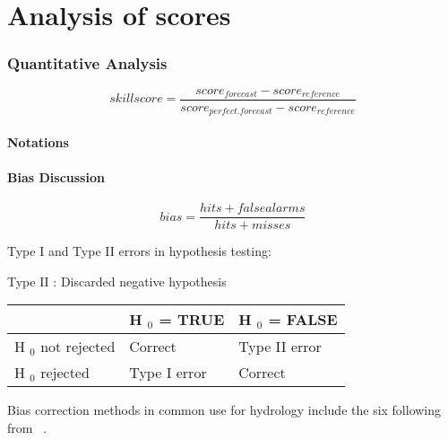\documentclass[logos,parttoc,morelanguage=french,morelanguage=italian]{orsay-memoire}
\begin{document}
{\dummytext


\part{Analysis of scores}

\section{Quantitative Analysis}

\begin{equation}\label{SkillscoreEquation}
skillscore =  \frac{score_{forecast} - score_{reference} }{score_{perfect.forecast} - score_{reference}}
\end{equation}

\subsection{Notations}


\subsection{Bias Discussion}

\begin{equation}\label{BiasEquation}
bias =  \frac{ hits + false alarms }{ hits + misses }
\end{equation}


Type I and Type II errors in hypothesis testing:

Type II : Discarded negative hypothesis

\begin{tabular}{|p{5cm}|p{4cm}|p{4cm}|}
    \hline
     & H $_{\text{0}}$ = TRUE & H $_{\text{0}}$ = FALSE\\
    \hline
    H $_{\text{0}}$ not rejected & Correct & Type II error\\
    \hline
    H $_{\text{0}}$ rejected & Type I error & Correct\\
    \hline
\end{tabular}

Bias correction methods in common use for hydrology include the six following from  ~\cite{teutschbein2013bias}.


}
\end{document}
